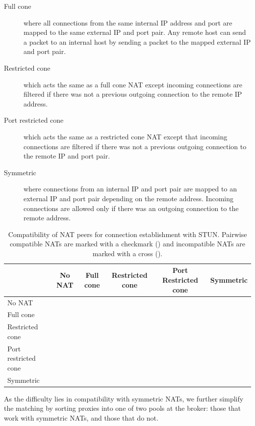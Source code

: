 \documentclass[letterpaper,twocolumn]{article}
\newcommand{\cmark}{\ding{51}}%
\newcommand{\xmark}{\ding{55}}%
\begin{document}
\begin{description}
    \item[Full cone] where all connections from the same internal IP address
        and port are mapped to the same external IP and port pair. Any remote
        host can send a packet to an internal host by sending a packet to the
        mapped external IP and port pair.
    \item[Restricted cone] which acts the same as a full cone NAT
        except incoming connections are filtered if there was not a previous outgoing connection
        to the remote IP address.
    \item[Port restricted cone] which acts the same as a restricted
        cone NAT except that incoming connections are filtered if there was not a previous
        outgoing connection to the remote IP and port pair.
    \item[Symmetric] where connections from an
        internal IP and port pair are mapped to an external IP and port pair depending 
        on the remote address. Incoming connections are allowed only if there was an outgoing
        connection to the remote address.
\end{description}


\begin{table}
    \centering
    \begin{tabular}{l|ccccc}
         & No NAT & Full cone & Restricted cone & Port Restricted cone & Symmetric\\
         \hline
        No NAT & \cmark & \cmark & \cmark & \cmark & \cmark \\
        Full cone & \cmark & \cmark &  \cmark & \cmark & \cmark \\
        Restricted cone & \cmark & \cmark & \cmark & \cmark & \cmark\\
        Port restricted cone & \cmark & \cmark & \cmark & \cmark & \xmark \\
        Symmetric & \cmark & \cmark & \cmark & \xmark & \xmark \\
    \end{tabular}
    \caption{Compatibility of NAT peers for connection establishment with STUN. 
    Pairwise compatible NATs are marked with a checkmark (\cmark) 
    and incompatible NATs are marked with a cross (\xmark).}
    \label{tab:nat-matching}
\end{table}

As the difficulty lies in compatibility with symmetric NATs, we further simplify
the matching by sorting proxies into one of two pools at the broker: those that work with
symmetric NATs, and those that do not.
\end{document}
